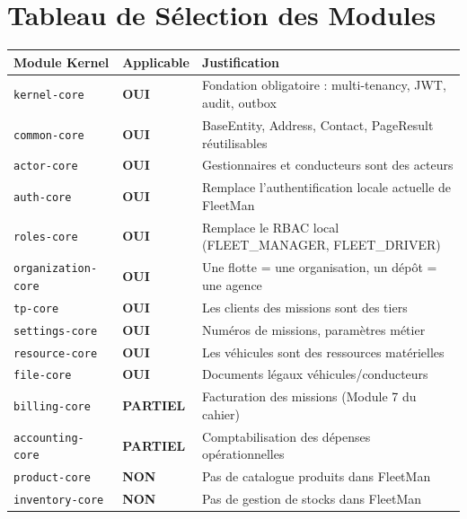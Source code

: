 \documentclass[12pt,a4paper]{report}
\begin{document}
\section{Tableau de Sélection des Modules}

\begin{longtable}{p{3.5cm}p{2cm}p{7.5cm}}
\toprule
\textbf{Module Kernel} & \textbf{Applicable} & \textbf{Justification} \\
\midrule
\endhead
\texttt{kernel-core} & \textcolor{fleetsuccess}{\textbf{OUI}} & Fondation obligatoire : multi-tenancy, JWT, audit, outbox \\
\texttt{common-core} & \textcolor{fleetsuccess}{\textbf{OUI}} & BaseEntity, Address, Contact, PageResult réutilisables \\
\texttt{actor-core} & \textcolor{fleetsuccess}{\textbf{OUI}} & Gestionnaires et conducteurs sont des acteurs \\
\texttt{auth-core} & \textcolor{fleetsuccess}{\textbf{OUI}} & Remplace l'authentification locale actuelle de FleetMan \\
\texttt{roles-core} & \textcolor{fleetsuccess}{\textbf{OUI}} & Remplace le RBAC local (FLEET\_MANAGER, FLEET\_DRIVER) \\
\texttt{organization-core} & \textcolor{fleetsuccess}{\textbf{OUI}} & Une flotte = une organisation, un dépôt = une agence \\
\texttt{tp-core} & \textcolor{fleetsuccess}{\textbf{OUI}} & Les clients des missions sont des tiers \\
\texttt{settings-core} & \textcolor{fleetsuccess}{\textbf{OUI}} & Numéros de missions, paramètres métier \\
\texttt{resource-core} & \textcolor{fleetsuccess}{\textbf{OUI}} & Les véhicules sont des ressources matérielles \\
\texttt{file-core} & \textcolor{fleetsuccess}{\textbf{OUI}} & Documents légaux véhicules/conducteurs \\
\texttt{billing-core} & \textcolor{fleetwarning}{\textbf{PARTIEL}} & Facturation des missions (Module 7 du cahier) \\
\texttt{accounting-core} & \textcolor{fleetwarning}{\textbf{PARTIEL}} & Comptabilisation des dépenses opérationnelles \\
\texttt{product-core} & \textcolor{fleeterror}{\textbf{NON}} & Pas de catalogue produits dans FleetMan \\
\texttt{inventory-core} & \textcolor{fleeterror}{\textbf{NON}} & Pas de gestion de stocks dans FleetMan \\

\end{longtable}
\end{document}
